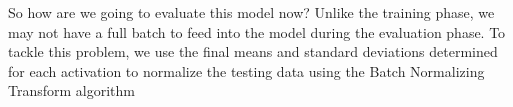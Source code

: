 {{%
So how are we going to evaluate this model now? Unlike the training phase, we may not have a full batch to feed into the model during the evaluation phase. To tackle this problem, we use the final means and standard deviations determined for each activation to normalize the testing data using the Batch Normalizing Transform algorithm
}
}

